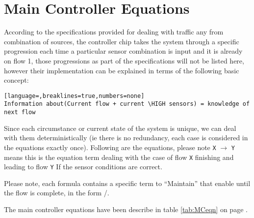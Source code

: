 \section{Main Controller Equations}
According to the specifications provided for dealing with traffic any from
combination of sources, the controller chip takes the system through a specific
progression each time a particular sensor combination is input and it is already
on flow 1, those progressions as part of the specifications will not be listed
here, however their implementation can be explained in terms of the following
basic concept:
\begin{lstlisting}[language=,breaklines=true,numbers=none]
Information about(Current flow + current \HIGH sensors) = knowledge of next flow
\end{lstlisting}
Since each circumstance or current state of the system is unique, we can deal
with them deterministically (ie there is no redundancy, each case is considered
in the equations exactly once). Following are the equations, please note
\texttt{X} $\to$ \texttt{Y} means this is the equation term dealing with the
case of flow \texttt{X} finishing and leading to flow \texttt{Y} If the sensor
conditions are correct.

Please note, each \ENX formula contains a specific term to ``Maintain'' that
enable until the flow is complete, in the form \ENX * /\FFX.

The main controller equations have been describe in table \ref{tab:MCeqn} on
page \pageref{tab:MCeqn}.
